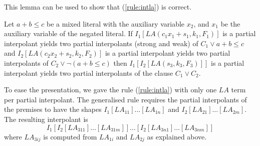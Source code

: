 This lemma can be used to show that (\ref{rule:intla}) is correct.
\begin{theorem}
  Let $a+b\leq c$ be a mixed literal with the auxiliary variable $x_2$, and
  $x_1$ be the auxiliary variable of the negated literal.  If
  $I_1[LA(c_1 x_1 + s_1, k_1, F_1)]$ 
  \ifnewinterpolation is a partial interpolant 
  \else yields two partial interpolants (strong and weak) \fi
  of $C_1 \lor a+b\leq c$ and 
  $I_2[LA(c_2 x_2 + s_2, k_2, F_2)]$ 
  \ifnewinterpolation is a partial interpolant 
  \else yields two partial interpolants \fi
  of $C_2 \lor \lnot(a+b\leq c)$ then
  $I_1[I_2[LA(s_3, k_3, F_3)]]$
  \ifnewinterpolation is a partial interpolant 
  \else yields two partial interpolants \fi
  of the clause $C_1 \vee C_2$.
\end{theorem}

To ease the presentation, we gave the rule (\ref{rule:intla}) with only one
$LA$ term per partial interpolant. The generalised rule requires the partial interpolants of
the premises to have the shapes $I_1[LA_{11}]\dots[LA_{1n}]$ and
$I_2[LA_{21}]\dots[LA_{2m}]$.  The resulting interpolant is
\[I_1[I_2[LA_{311}]\dots[LA_{31m}]]\dots [I_2[LA_{3n1}]\dots[LA_{3nm}]]\]
where $LA_{3ij}$ is computed from $LA_{1i}$ and $LA_{2j}$
as explained above.

